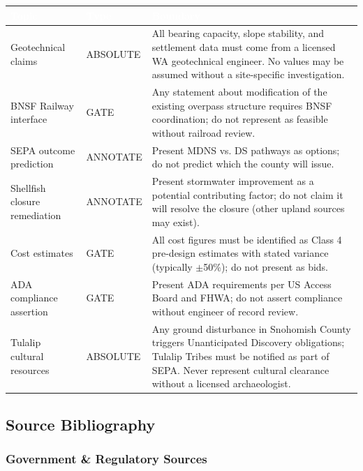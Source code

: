 \documentclass[11pt,letterpaper]{article}
\newcommand{\tableheader}[1]{\textbf{\sffamily\textcolor{white}{#1}}}
\begin{document}
\begin{center}
\begin{tabularx}{\textwidth}{L{3.5cm}L{2cm}X}
\toprule
{}
\tableheader{Topic} & \tableheader{Type} & \tableheader{Boundary} \\
\midrule
Geotechnical claims & ABSOLUTE & All bearing capacity, slope stability, and settlement data must come from a licensed WA geotechnical engineer. No values may be assumed without a site-specific investigation. \\
BNSF Railway interface & GATE & Any statement about modification of the existing overpass structure requires BNSF coordination; do not represent as feasible without railroad review. \\
SEPA outcome prediction & ANNOTATE & Present MDNS vs. DS pathways as options; do not predict which the county will issue. \\
Shellfish closure remediation & ANNOTATE & Present stormwater improvement as a potential contributing factor; do not claim it will resolve the closure (other upland sources may exist). \\
Cost estimates & GATE & All cost figures must be identified as Class 4 pre-design estimates with stated variance (typically $\pm$50\%); do not present as bids. \\
ADA compliance assertion & GATE & Present ADA requirements per US Access Board and FHWA; do not assert compliance without engineer of record review. \\
Tulalip cultural resources & ABSOLUTE & Any ground disturbance in Snohomish County triggers Unanticipated Discovery obligations; Tulalip Tribes must be notified as part of SEPA. Never represent cultural clearance without a licensed archaeologist. \\
\bottomrule
\end{tabularx}
\end{center}

\subsection{Source Bibliography}

\subsubsection{Government \& Regulatory Sources}
\end{document}
